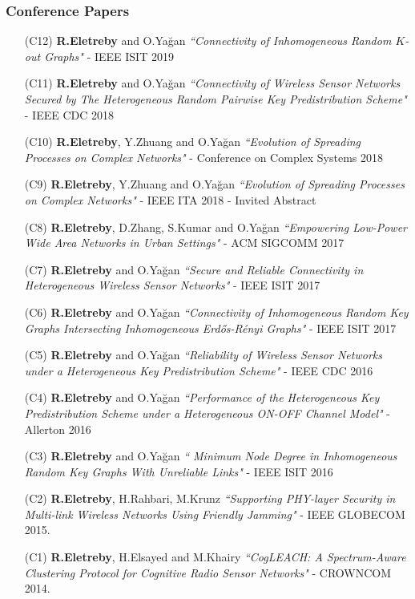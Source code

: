 \documentclass[letterpaper,11pt]{article}
\begin{document}
\subsubsection{\quad \large Conference Papers}
\begin{itemize}
\item [(C12)] \textbf{R.Eletreby} and O.Ya\u{g}an \textit{``Connectivity of Inhomogeneous Random $K$-out Graphs"} - IEEE ISIT 2019

\item [(C11)] \textbf{R.Eletreby} and O.Ya\u{g}an \textit{``Connectivity of Wireless Sensor Networks Secured by The Heterogeneous Random Pairwise Key Predistribution Scheme"} - IEEE CDC 2018

\item [(C10)] \textbf{R.Eletreby}, Y.Zhuang and O.Ya\u{g}an \textit{``Evolution of Spreading Processes on Complex Networks"} - Conference on Complex Systems 2018

\item [(C9)] \textbf{R.Eletreby}, Y.Zhuang and O.Ya\u{g}an \textit{``Evolution of Spreading Processes on Complex Networks"} - IEEE ITA 2018 - Invited Abstract

\item [(C8)] \textbf{R.Eletreby}, D.Zhang, S.Kumar and O.Ya\u{g}an \textit{``Empowering Low-Power Wide Area Networks in Urban Settings"} - ACM SIGCOMM 2017

\item [(C7)] \textbf{R.Eletreby} and O.Ya\u{g}an \textit{``Secure and Reliable Connectivity in Heterogeneous Wireless Sensor Networks"} - IEEE ISIT 2017

\item [(C6)] \textbf{R.Eletreby} and O.Ya\u{g}an \textit{``Connectivity of Inhomogeneous Random Key Graphs Intersecting Inhomogeneous Erd\H{o}s-R\'enyi Graphs"} - IEEE ISIT 2017

\item [(C5)] \textbf{R.Eletreby} and O.Ya\u{g}an \textit{``Reliability of Wireless Sensor Networks under a Heterogeneous Key Predistribution Scheme"} - IEEE CDC 2016

\item [(C4)] \textbf{R.Eletreby} and O.Ya\u{g}an \textit{``Performance of the Heterogeneous Key Predistribution Scheme under a Heterogeneous ON-OFF Channel Model"} - Allerton 2016

\item [(C3)] \textbf{R.Eletreby} and O.Ya\u{g}an \textit{`` Minimum Node Degree in Inhomogeneous Random Key Graphs With Unreliable Links"} - IEEE ISIT 2016

\item [(C2)] \textbf{R.Eletreby}, H.Rahbari, M.Krunz \textit{``Supporting PHY-layer Security in Multi-link Wireless Networks Using Friendly Jamming"} - IEEE GLOBECOM 2015.

\item [(C1)] \textbf{R.Eletreby}, H.Elsayed and M.Khairy \textit{``CogLEACH: A Spectrum-Aware Clustering Protocol for Cognitive Radio Sensor Networks"} - CROWNCOM 2014.
\end{itemize}


\end{document}
